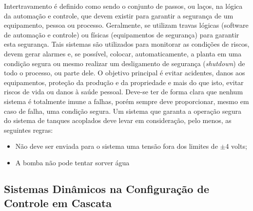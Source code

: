\hspace{4ex}Intertravamento é definido como sendo o conjunto de passos, ou laços, na lógica da automação e controle, que devem existir para garantir a segurança de um equipamento, pessoa ou processo. Geralmente, se utilizam travas lógicas (software de automação e controle) ou físicas (equipamentos de segurança) para garantir esta segurança. \newline
\hspace{4ex}Tais sistemas são utilizados para monitorar as condições de riscos, devem gerar alarmes e, se possível, colocar, automaticamente, a planta em uma condição segura ou mesmo realizar um desligamento de segurança (\textit{shutdown}) de todo o processo, ou parte dele. O objetivo principal é evitar acidentes, danos aos equipamentos, proteção da produção e da propriedade e mais do que isto, evitar riscos de vida ou danos à saúde pessoal. Deve-se ter de forma clara que nenhum sistema é totalmente imune a falhas, porém sempre deve proporcionar, mesmo em caso de falha, uma condição segura.\newline
\hspace{4ex}Um sistema que garanta a operação segura do sistema de tanques acoplados deve levar em consideração, pelo menos, as seguintes regras:
\begin{itemize}
    \item Não deve ser enviada para o sistema uma tensão fora dos limites de \(\pm\)4 volts;
    \item A bomba não pode tentar sorver água
\end{itemize}

\subsection{Sistemas Dinâmicos na Configuração de Controle em Cascata}\hspace{4ex}